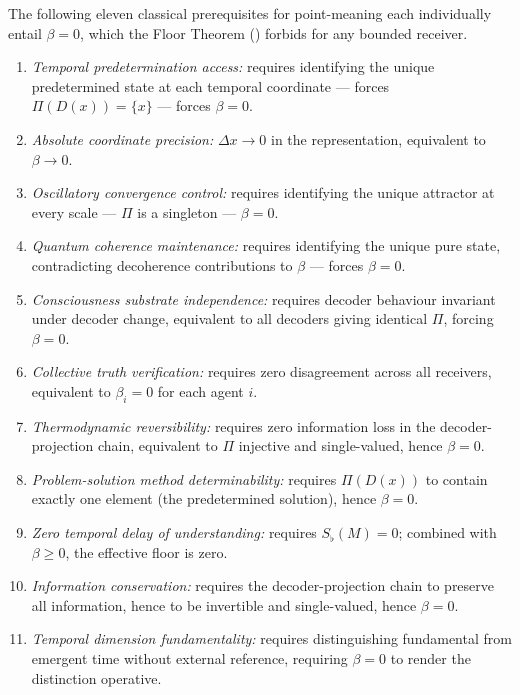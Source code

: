 \documentclass[twocolumn,11pt,a4paper]{article}
\newcommand{\Sfloor}{S_{\flat}}
\begin{document}
\begin{theorem}
\label{thm:elevenfold}
The following eleven classical prerequisites for point-meaning each
individually entail $\beta=0$, which the Floor Theorem ()
forbids for any bounded receiver.

\begin{enumerate}[label=(\Roman*),leftmargin=*]
  \item \emph{Temporal predetermination access:} requires identifying the
    unique predetermined state at each temporal coordinate — forces
    $\Pi(D(x))=\{x\}$ — forces $\beta=0$.
  \item \emph{Absolute coordinate precision:} $\Delta x\to 0$ in the
    representation, equivalent to $\beta\to 0$.
  \item \emph{Oscillatory convergence control:} requires identifying the
    unique attractor at every scale — $\Pi$ is a singleton — $\beta=0$.
  \item \emph{Quantum coherence maintenance:} requires identifying the
    unique pure state, contradicting decoherence contributions to $\beta$
    — forces $\beta=0$.
  \item \emph{Consciousness substrate independence:} requires decoder
    behaviour invariant under decoder change, equivalent to all decoders
    giving identical $\Pi$, forcing $\beta=0$.
  \item \emph{Collective truth verification:} requires zero disagreement
    across all receivers, equivalent to $\beta_i=0$ for each agent $i$.
  \item \emph{Thermodynamic reversibility:} requires zero information loss
    in the decoder-projection chain, equivalent to $\Pi$ injective and
    single-valued, hence $\beta=0$.
  \item \emph{Problem-solution method determinability:} requires
    $\Pi(D(x))$ to contain exactly one element (the predetermined
    solution), hence $\beta=0$.
  \item \emph{Zero temporal delay of understanding:} requires
    $\Sfloor(M)=0$; combined with $\beta\geq 0$, the effective floor is
    zero.
  \item \emph{Information conservation:} requires the decoder-projection
    chain to preserve all information, hence to be invertible and
    single-valued, hence $\beta=0$.
  \item \emph{Temporal dimension fundamentality:} requires distinguishing
    fundamental from emergent time without external reference, requiring
    $\beta=0$ to render the distinction operative.
\end{enumerate}
\end{theorem}
\end{document}
